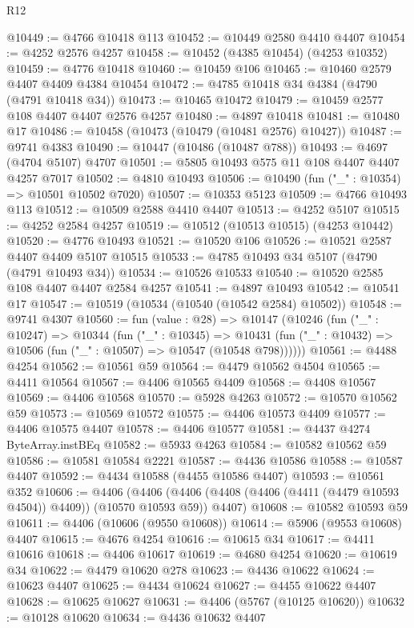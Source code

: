 \begin{lexlean}{R12}
\begin{coremodule}
@10449 := @4766 @10418 @113
@10452 := @10449 @2580 @4410 @4407
@10454 := @4252 @2576 @4257
@10458 := @10452 (@4385 @10454) (@4253 @10352)
@10459 := @4776 @10418
@10460 := @10459 @106
@10465 := @10460 @2579 @4407 @4409 @4384 @10454
@10472 := @4785 @10418 @34 @4384 (@4790 (@4791 @10418 @34))
@10473 := @10465 @10472
@10479 := @10459 @2577 @108 @4407 @4407 @2576 @4257
@10480 := @4897 @10418
@10481 := @10480 @17
@10486 := @10458 (@10473 (@10479 (@10481 @2576) @10427))
@10487 := @9741 @4383
@10490 := @10447 (@10486 (@10487 @788))
@10493 := @4697 (@4704 @5107) @4707
@10501 := @5805 @10493 @575 @11 @108 @4407 @4407 @4257 @7017
@10502 := @4810 @10493
@10506 := @10490 (fun ("_" : @10354) => @10501 @10502 @7020)
@10507 := @10353 @5123
@10509 := @4766 @10493 @113
@10512 := @10509 @2588 @4410 @4407
@10513 := @4252 @5107
@10515 := @4252 @2584 @4257
@10519 := @10512 (@10513 @10515) (@4253 @10442)
@10520 := @4776 @10493
@10521 := @10520 @106
@10526 := @10521 @2587 @4407 @4409 @5107 @10515
@10533 := @4785 @10493 @34 @5107 (@4790 (@4791 @10493 @34))
@10534 := @10526 @10533
@10540 := @10520 @2585 @108 @4407 @4407 @2584 @4257
@10541 := @4897 @10493
@10542 := @10541 @17
@10547 := @10519 (@10534 (@10540 (@10542 @2584) @10502))
@10548 := @9741 @4307
@10560 := fun (value : @28) =>
  @10147
    (@10246
      (fun ("_" : @10247) =>
      @10344
        (fun ("_" : @10345) =>
        @10431 (fun ("_" : @10432) => @10506 (fun ("_" : @10507) => @10547 (@10548 @798))))))
@10561 := @4488 @4254
@10562 := @10561 @59
@10564 := @4479 @10562 @4504
@10565 := @4411 @10564
@10567 := @4406 @10565 @4409
@10568 := @4408 @10567
@10569 := @4406 @10568
@10570 := @5928 @4263
@10572 := @10570 @10562 @59
@10573 := @10569 @10572
@10575 := @4406 @10573 @4409
@10577 := @4406 @10575 @4407
@10578 := @4406 @10577
@10581 := @4437 @4274 ByteArray.instBEq
@10582 := @5933 @4263
@10584 := @10582 @10562 @59
@10586 := @10581 @10584 @2221
@10587 := @4436 @10586
@10588 := @10587 @4407
@10592 := @4434 @10588 (@4455 @10586 @4407)
@10593 := @10561 @352
@10606 := @4406
    (@4406 (@4406 (@4408 (@4406 (@4411 (@4479 @10593 @4504)) @4409)) (@10570 @10593 @59)) @4407)
@10608 := @10582 @10593 @59
@10611 := @4406 (@10606 (@9550 @10608))
@10614 := @5906 (@9553 @10608) @4407
@10615 := @4676 @4254
@10616 := @10615 @34
@10617 := @4411 @10616
@10618 := @4406 @10617
@10619 := @4680 @4254
@10620 := @10619 @34
@10622 := @4479 @10620 @278
@10623 := @4436 @10622
@10624 := @10623 @4407
@10625 := @4434 @10624
@10627 := @4455 @10622 @4407
@10628 := @10625 @10627
@10631 := @4406 (@5767 (@10125 @10620))
@10632 := @10128 @10620
@10634 := @4436 @10632 @4407

\end{coremodule}
\end{lexlean}
